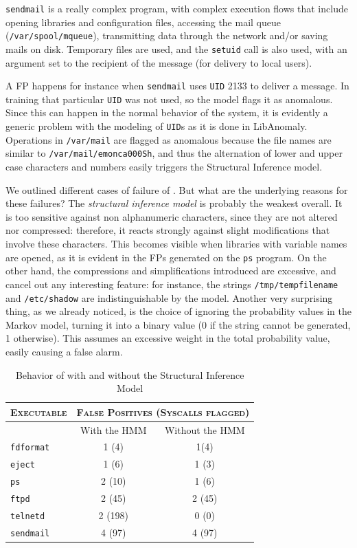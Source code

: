 \texttt{sendmail} is a really complex program, with complex execution
flows that include opening libraries and configuration files,
accessing the mail queue (\texttt{/var/spool/mqueue}), transmitting
data through the network and/or saving mails on disk. Temporary files
are used, and the \texttt{setuid} call is also used, with an argument
set to the recipient of the message (for delivery to local users).

A \ac{FP} happens for instance when \texttt{sendmail} uses
\texttt{UID} 2133 to deliver a message. In training that particular
\texttt{UID} was not used, so the model flags it as anomalous. Since
this can happen in the normal behavior of the system, it is evidently
a generic problem with the modeling of \texttt{UID}s as it is done in
LibAnomaly. Operations in \texttt{/var/mail} are flagged as anomalous
because the file names are similar to \texttt{/var/mail/emonca000Sh},
and thus the alternation of lower and upper case characters and
numbers easily triggers the Structural Inference model.

We outlined different cases of failure of \SyscallAnomaly. But what
are the underlying reasons for these failures? The \emph{structural
  inference model} is probably the weakest overall. It is too
sensitive against non alphanumeric characters, since they are not
altered nor compressed: therefore, it reacts strongly against slight
modifications that involve these characters. This becomes visible when
libraries with variable names are opened, as it is evident in the
\acp{FP} generated on the \texttt{ps} program. On the other
hand, the compressions and simplifications introduced are excessive,
and cancel out any interesting feature: for instance, the strings
\texttt{/tmp/tempfilename} and \texttt{/etc/shadow} are
indistinguishable by the model. Another very surprising thing, as we
already noticed, is the choice of ignoring the probability values in
the Markov model, turning it into a binary value (0 if the string
cannot be generated, 1 otherwise). This assumes an excessive weight in
the total probability value, easily causing a false alarm.

\begin{table}[tb]
  \centering
  \begin{tabular}{lcc}
    \toprule
    \textsc{Executable} & \multicolumn{2}{c}{\scshape False Positives (Syscalls flagged)} \\
    \midrule
    & With the \ac{HMM}\index{HMM} & Without the \ac{HMM}\index{HMM}\\
    \cmidrule{2-3}
    \texttt{fdformat} & 1 (4) & 1(4)\\
    \texttt{eject} & 1 (6) & 1 (3)\\
    \texttt{ps} & 2 (10) & 1 (6)\\
    \texttt{ftpd} & 2 (45) & 2 (45)\\
    \texttt{telnetd} & 2 (198) & 0 (0)\\
    \texttt{sendmail} & 4 (97) & 4 (97)\\
    \bottomrule
  \end{tabular}
  \caption{Behavior of \SyscallAnomaly with and without the Structural Inference Model}
  \label{tab:excl-HMM}
\end{table}

